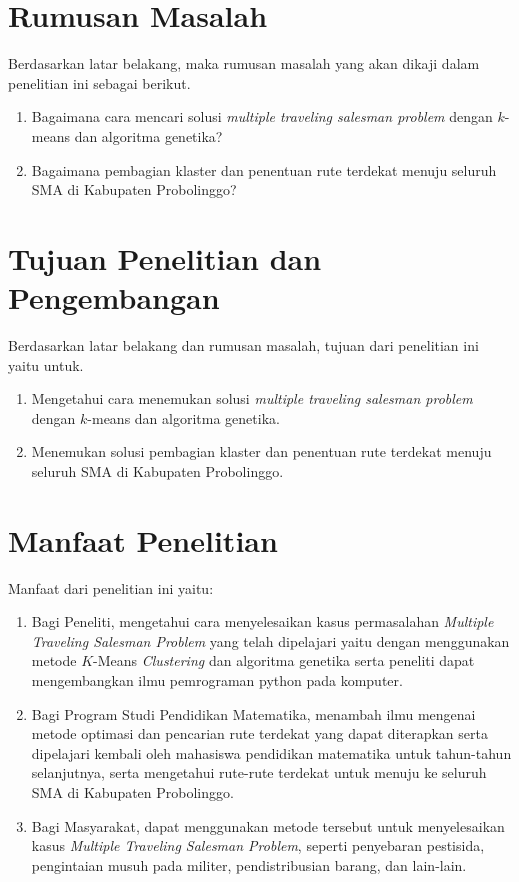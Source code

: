 \section{Rumusan Masalah}

Berdasarkan latar belakang, maka rumusan masalah yang akan dikaji dalam penelitian ini sebagai berikut.
\begin{enumerate}
    \item Bagaimana cara mencari solusi \textit{multiple traveling salesman problem} dengan $k$-means dan algoritma genetika?
    \item Bagaimana pembagian klaster dan penentuan rute terdekat menuju seluruh SMA di Kabupaten Probolinggo?
\end{enumerate}

\section{Tujuan Penelitian dan Pengembangan}

Berdasarkan latar belakang dan rumusan masalah, tujuan dari penelitian ini yaitu untuk.
\begin{enumerate}
	\item Mengetahui cara menemukan solusi \textit{multiple traveling salesman problem} dengan $k$-means dan algoritma genetika.
	\item Menemukan solusi pembagian klaster dan penentuan rute terdekat menuju seluruh SMA di Kabupaten Probolinggo.
\end{enumerate}

\section{Manfaat Penelitian}

Manfaat dari penelitian ini yaitu:
\begin{enumerate}
	\item Bagi Peneliti, mengetahui cara menyelesaikan kasus permasalahan \textit{Multiple Traveling Salesman Problem} yang telah dipelajari yaitu dengan menggunakan metode $K$-Means \textit{Clustering} dan algoritma genetika serta peneliti dapat mengembangkan ilmu pemrograman python pada komputer.

	\item Bagi Program Studi Pendidikan Matematika, menambah ilmu mengenai metode optimasi dan pencarian rute terdekat yang dapat diterapkan serta dipelajari kembali oleh mahasiswa pendidikan matematika untuk tahun-tahun selanjutnya, serta mengetahui rute-rute terdekat untuk menuju ke seluruh SMA di Kabupaten Probolinggo.
	
	\item Bagi Masyarakat, dapat menggunakan metode tersebut untuk menyelesaikan kasus \textit{Multiple Traveling Salesman Problem}, seperti penyebaran pestisida, pengintaian musuh pada militer, pendistribusian barang, dan lain-lain.
	
\end{enumerate}

